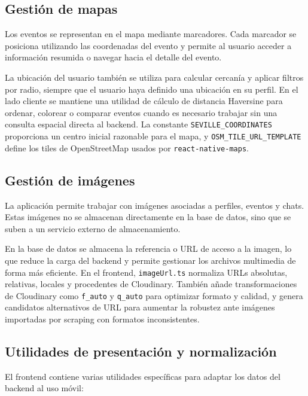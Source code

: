 \subsection{Gestión de mapas}

Los eventos se representan en el mapa mediante marcadores. Cada marcador se posiciona utilizando las coordenadas del evento y permite al usuario acceder a información resumida o navegar hacia el detalle del evento.

La ubicación del usuario también se utiliza para calcular cercanía y aplicar filtros por radio, siempre que el usuario haya definido una ubicación en su perfil. En el lado cliente se mantiene una utilidad de cálculo de distancia Haversine para ordenar, colorear o comparar eventos cuando es necesario trabajar sin una consulta espacial directa al backend. La constante \texttt{SEVILLE\_COORDINATES} proporciona un centro inicial razonable para el mapa, y \texttt{OSM\_TILE\_URL\_TEMPLATE} define los tiles de OpenStreetMap usados por \texttt{react-native-maps}.

\subsection{Gestión de imágenes}

La aplicación permite trabajar con imágenes asociadas a perfiles, eventos y chats. Estas imágenes no se almacenan directamente en la base de datos, sino que se suben a un servicio externo de almacenamiento.

En la base de datos se almacena la referencia o URL de acceso a la imagen, lo que reduce la carga del backend y permite gestionar los archivos multimedia de forma más eficiente. En el frontend, \texttt{imageUrl.ts} normaliza URLs absolutas, relativas, locales y procedentes de Cloudinary. También añade transformaciones de Cloudinary como \texttt{f\_auto} y \texttt{q\_auto} para optimizar formato y calidad, y genera candidatos alternativos de URL para aumentar la robustez ante imágenes importadas por scraping con formatos inconsistentes.

\subsection{Utilidades de presentación y normalización}

El frontend contiene varias utilidades específicas para adaptar los datos del backend al uso móvil:

